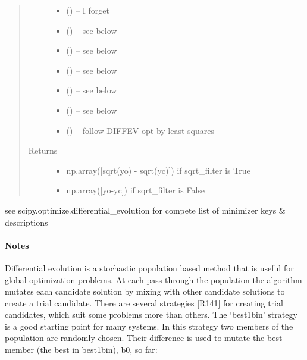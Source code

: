 \documentclass[letterpaper,10pt,english]{sphinxmanual}
\begin{document}
\begin{fulllineitems}
\begin{fulllineitems}
\begin{quote}
\begin{description}
\begin{itemize}
\item {} 
 () -- I forget

\item {} 
 () -- see below

\item {} 
 () -- see below

\item {} 
 () -- see below

\item {} 
 () -- see below

\item {} 
 () -- see below

\item {} 
 () -- follow DIFFEV opt by least squares

\end{itemize}

\item[{Returns}] \leavevmode
\begin{itemize}
\item {} 
np.array({[}sqrt(yo) - sqrt(yc){]}) if sqrt\_filter is True

\item {} 
np.array({[}yo-yc{]}) if sqrt\_filter is False

\end{itemize}


\end{description}\end{quote}

see scipy.optimize.differential\_evolution for compete list of minimizer keys \& descriptions
\paragraph{Notes}

Differential evolution is a stochastic population based method that is useful for
global optimization problems. At each pass through the population the algorithm
mutates each candidate solution by mixing with other candidate solutions to create
a trial candidate. There are several strategies {[}R141{]} for creating trial candidates,
which suit some problems more than others. The ‘best1bin’ strategy is a good
starting point for many systems. In this strategy two members of the population are
randomly chosen. Their difference is used to mutate the best member
(the best in best1bin), b0, so far:


\end{fulllineitems}
\end{fulllineitems}
\end{document}
